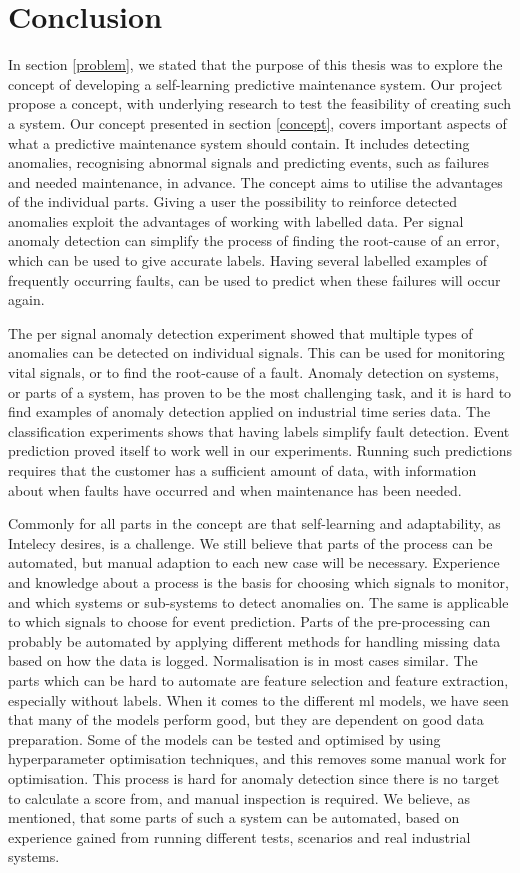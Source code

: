 \documentclass[english, a4paper]{report}
\begin{document}
\newpage
\chapter{Conclusion}
{
    In section \ref{problem}, we stated that the purpose of this thesis was to explore the concept of developing a self-learning predictive maintenance system. Our project propose a concept, with underlying research to test the feasibility of creating such a system. Our concept presented in section \ref{concept}, covers important aspects of what a predictive maintenance system should contain. It includes detecting anomalies, recognising abnormal signals and predicting events, such as failures and needed maintenance, in advance. The concept aims to utilise the advantages of the individual parts. Giving a user the possibility to reinforce detected anomalies exploit the advantages of working with labelled data. Per signal anomaly detection can simplify the process of finding the root-cause of an error, which can be used to give accurate labels. Having several labelled examples of frequently occurring faults, can be used to predict when these failures will occur again.   
    \par 
    The per signal anomaly detection experiment showed that multiple types of anomalies can be detected on individual signals. This can be used for monitoring vital signals, or to find the root-cause of a fault. Anomaly detection on systems, or parts of a system, has proven to be the most challenging task, and it is hard to find examples of anomaly detection applied on industrial time series data.
    The classification experiments shows that having labels simplify fault detection. Event prediction proved itself to work well in our experiments. Running such predictions requires that the customer has a sufficient amount of data, with information about when faults have occurred and when maintenance has been needed.
    \par
    Commonly for all parts in the concept are that self-learning and adaptability, as Intelecy desires, is a challenge. We still believe that parts of the process can be automated, but manual adaption to each new case will be necessary. Experience and knowledge about a process is the basis for choosing which signals to monitor, and which systems or sub-systems to detect anomalies on. The same is applicable to which signals to choose for event prediction. Parts of the pre-processing can probably be automated by applying different methods for handling missing data based on how the data is logged. Normalisation is in most cases similar. The parts which can be hard to automate are feature selection and feature extraction, especially without labels. When it comes to the different \gls{ml} models, we have seen that many of the models perform good, but they are dependent on good data preparation. Some of the models can be tested and optimised by using hyperparameter optimisation techniques, and this removes some manual work for optimisation. This process is hard for anomaly detection since there is no target to calculate a score from, and manual inspection is required. We believe, as mentioned, that some parts of such a system can be automated, based on experience gained from running different tests, scenarios and real industrial systems.
}
\end{document}
